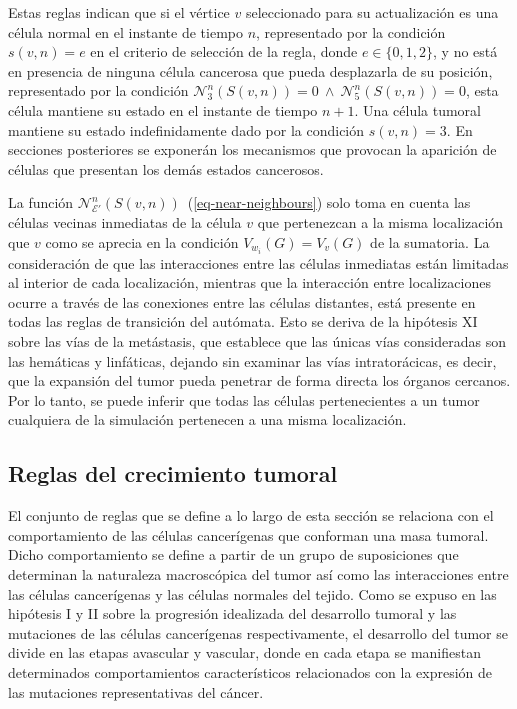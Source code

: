 Estas reglas indican que si el vértice $v$ seleccionado para su actualización es una célula normal en el instante de tiempo $n$, representado por la condición $s(v,n)=e$ en el criterio de selección de la regla, donde $e \in \lbrace 0,1,2 \rbrace$, y no está en presencia de ninguna célula cancerosa que pueda desplazarla de su posición, representado por la condición $\mathcal{N}_3^n(S(v,n))=0~\wedge~\mathcal{N}_5^n(S(v,n))=0$, esta célula mantiene su estado en el instante de tiempo $n+1$. Una célula tumoral mantiene su estado indefinidamente dado por la condición $s(v,n)=3$. En secciones posteriores se exponerán los mecanismos que provocan la aparición de células que presentan los demás estados cancerosos.

La funci\'on $\mathcal{N}_{\mathcal{E'}}^n(S(v,n))$~(\ref{eq-near-neighbours}) solo toma en cuenta las c\'elulas vecinas inmediatas de la c\'elula $v$ que pertenezcan a la misma localizaci\'on que $v$ como se aprecia en la condici\'on $V_{w_i}(G)=V_v(G)$ de la sumatoria. La consideración de que las interacciones entre las células inmediatas están limitadas al interior de cada localización, mientras que la interacción entre localizaciones ocurre a través de las conexiones entre las células distantes, está presente en todas las reglas de transición del autómata. Esto se deriva de la hipótesis XI sobre las vías de la metástasis, que establece que las únicas vías consideradas son las hemáticas y linfáticas, dejando sin examinar las vías intratorácicas, es decir, que la expansión del tumor pueda penetrar de forma directa los órganos cercanos. Por lo tanto, se puede inferir que todas las células pertenecientes a un tumor cualquiera de la simulación pertenecen a una misma localización.

\subsection{Reglas del crecimiento tumoral}
\label{subsec-celldiv}
El conjunto de reglas que se define a lo largo de esta secci\'on se relaciona con el comportamiento de las c\'elulas cancer\'igenas que conforman una masa tumoral. Dicho comportamiento se define a partir de un grupo de suposiciones que determinan la naturaleza macrosc\'opica del tumor as\'i como las interacciones entre las c\'elulas cancer\'igenas y las c\'elulas normales del tejido. Como se expuso en las hip\'otesis I y II sobre la progresi\'on idealizada del desarrollo tumoral y las mutaciones de las c\'elulas cancer\'igenas respectivamente, el desarrollo del tumor se divide en las etapas avascular y vascular, donde en cada etapa se manifiestan determinados comportamientos caracter\'isticos relacionados con la expresi\'on de las mutaciones representativas del c\'ancer. 

